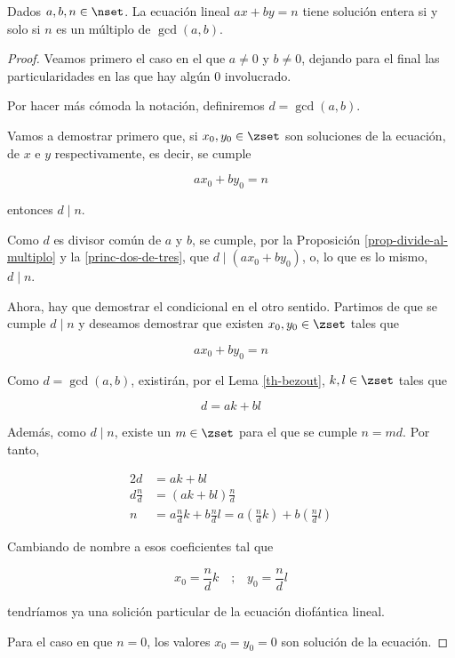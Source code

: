 


\begin{theorem}
  Dados $a, b, n \in \nset$. La ecuación lineal $ax + by = n$ tiene solución
  entera si y solo si $n$ es un múltiplo de $\gcd(a, b)$.
\end{theorem}

\begin{proof}
  Veamos primero el caso en el que $a \neq 0$ y $b \neq 0$, dejando para el
  final las particularidades en las que hay algún 0 involucrado.

  Por hacer más cómoda la notación, definiremos $d = \gcd(a, b)$.

  Vamos a demostrar primero que, si $x_0, y_0 \in \zset$ son soluciones de
  la ecuación, de $x$ e $y$ respectivamente, es decir, se cumple

  $$ ax_0 + by_0 = n $$

  \noindent entonces $d \mid n$.

  Como $d$ es divisor común de $a$ y $b$, se cumple, por la Proposición
  \ref{prop-divide-al-multiplo} y la \ref{princ-dos-de-tres}, que $d \mid
  (ax_0 + by_0)$, o, lo que es lo mismo, $d \mid n$.

  Ahora, hay que demostrar el condicional en el otro sentido. Partimos de
  que se cumple $d \mid n$ y deseamos demostrar que existen $x_0, y_0 \in
  \zset$ tales que

  $$ ax_0 + by_0 = n $$

  Como $d = \gcd(a, b)$, existirán, por el Lema \ref{th-bezout}, $k, l \in
  \zset$ tales que

  $$ d = ak + bl $$

  Además, como $d \mid n$, existe un $m \in \zset$ para el que se cumple $n
  = md$. Por tanto,

  \begin{alignat*}{2}
    d             &= ak + bl \\
    d\frac{n}{d}  &= (ak + bl)\frac{n}{d} \\
    n             &= a\frac{n}{d}k + b\frac{n}{d}l =
      a\left(\frac{n}{d}k\right) + b\left(\frac{n}{d}l\right)
  \end{alignat*}

  Cambiando de nombre a esos coeficientes tal que

  $$ x_0 = \frac{n}{d}k \quad \text{;} \quad y_0 = \frac{n}{d}l $$

  \noindent tendríamos ya una solición particular de la ecuación diofántica
  lineal.

  Para el caso en que $n = 0$, los valores $x_0 = y_0 = 0$ son solución de
  la ecuación.

\end{proof}

